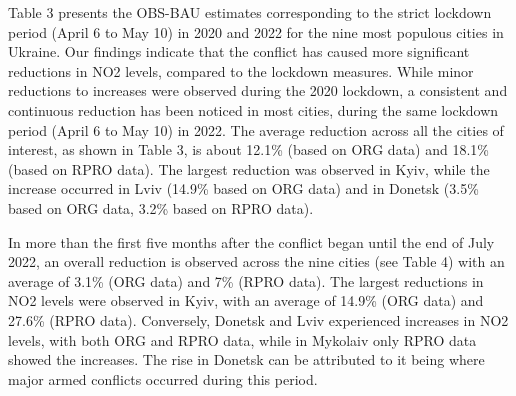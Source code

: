 Table 3 presents the OBS-BAU estimates corresponding to the strict lockdown period (April 6 to May 10) in 2020 and 2022 for the nine most populous cities in Ukraine. Our findings indicate that the conflict has caused more significant reductions in NO2 levels, compared to the lockdown measures. While minor reductions to increases were observed during the 2020 lockdown, a consistent and continuous reduction has been noticed in most cities, during the same lockdown period (April 6 to May 10) in 2022. The average reduction across all the cities of interest, as shown in Table 3, is about 12.1\% (based on ORG data) and 18.1\% (based on RPRO data). The largest reduction was observed in Kyiv, while the increase occurred in Lviv (14.9\% based on ORG data) and in Donetsk (3.5\% based on ORG data, 3.2\% based on RPRO data).\par

In more than the first five months after the conflict began until the end of July 2022, an overall reduction is observed across the nine cities (see Table 4) with an average of 3.1\% (ORG data) and 7\% (RPRO data). The largest reductions in NO2 levels were observed in Kyiv, with an average of 14.9\% (ORG data) and 27.6\% (RPRO data). Conversely, Donetsk and Lviv experienced increases in NO2 levels, with both ORG and RPRO data, while in Mykolaiv only RPRO data showed the increases. The rise in Donetsk can be attributed to it being where major armed conflicts occurred during this period.\par
